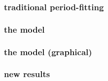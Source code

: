 \documentclass[pdftex]{beamer}
\begin{document}
\begin{frame}
\end{frame}

\begin{frame}
  \frametitle{traditional period-fitting}
\end{frame}

\begin{frame}
  \frametitle{the model}
\end{frame}

\begin{frame}
  \frametitle{the model (graphical)}
\end{frame}

\begin{frame}
  \frametitle{new results}
\end{frame}
\end{document}

